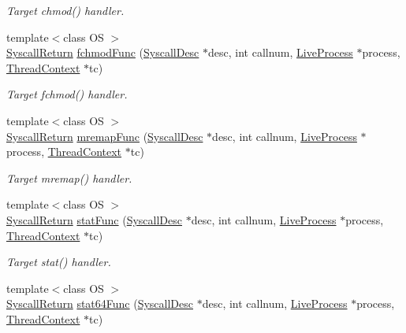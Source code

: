 \begin{DoxyCompactItemize}
\begin{DoxyCompactList}\small\item\em Target chmod() handler. \item\end{DoxyCompactList}\item 
{\footnotesize template$<$class OS $>$ }\\\hyperlink{classSyscallReturn}{SyscallReturn} \hyperlink{syscall__emul_8hh_a2a90cedb240b916a2546d84789f65edb}{fchmodFunc} (\hyperlink{classSyscallDesc}{SyscallDesc} $\ast$desc, int callnum, \hyperlink{classLiveProcess}{LiveProcess} $\ast$process, \hyperlink{classThreadContext}{ThreadContext} $\ast$tc)
\begin{DoxyCompactList}\small\item\em Target fchmod() handler. \item\end{DoxyCompactList}\item 
{\footnotesize template$<$class OS $>$ }\\\hyperlink{classSyscallReturn}{SyscallReturn} \hyperlink{syscall__emul_8hh_aece41171f976116d684969b11ff688fb}{mremapFunc} (\hyperlink{classSyscallDesc}{SyscallDesc} $\ast$desc, int callnum, \hyperlink{classLiveProcess}{LiveProcess} $\ast$process, \hyperlink{classThreadContext}{ThreadContext} $\ast$tc)
\begin{DoxyCompactList}\small\item\em Target mremap() handler. \item\end{DoxyCompactList}\item 
{\footnotesize template$<$class OS $>$ }\\\hyperlink{classSyscallReturn}{SyscallReturn} \hyperlink{syscall__emul_8hh_a90a4079ec4c293ae75368d283892a19a}{statFunc} (\hyperlink{classSyscallDesc}{SyscallDesc} $\ast$desc, int callnum, \hyperlink{classLiveProcess}{LiveProcess} $\ast$process, \hyperlink{classThreadContext}{ThreadContext} $\ast$tc)
\begin{DoxyCompactList}\small\item\em Target stat() handler. \item\end{DoxyCompactList}\item 
{\footnotesize template$<$class OS $>$ }\\\hyperlink{classSyscallReturn}{SyscallReturn} \hyperlink{syscall__emul_8hh_a03ce27f716fe9fc0eb250d09c1ff1683}{stat64Func} (\hyperlink{classSyscallDesc}{SyscallDesc} $\ast$desc, int callnum, \hyperlink{classLiveProcess}{LiveProcess} $\ast$process, \hyperlink{classThreadContext}{ThreadContext} $\ast$tc)

\end{DoxyCompactItemize}
